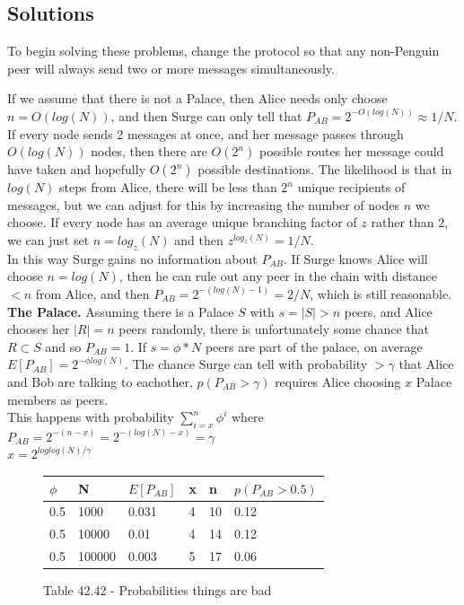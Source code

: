 \documentclass{paper}
\begin{document}
\subsection{Solutions}
To begin solving these problems, change the protocol so that any non-Penguin peer will always send two or more messages simultaneously.

If we assume that there is not a Palace, then Alice needs only choose $n = O(log(N))$, and then Surge can only tell that $P_{AB} = 2^{-O(log(N))} \approx 1/N $. If every node sends 2 messages at once, and her message passes through $O(log(N))$ nodes, then there are $O(2^n)$ possible routes her message could have taken and hopefully $O(2^n)$ possible destinations. The likelihood is that in $log(N)$ steps from Alice, there will be less than $2^n$ unique recipients of messages, but we can adjust for this by increasing the number of nodes $n$ we choose. If every node has an average unique branching factor of $z$ rather than $2$, we can just set $n = log_z(N)$ and then $z^{log_z(N)} = 1/N$.
\\In this way Surge gains no information about $P_{AB}$. If Surge knows Alice will choose $n = log(N)$, then he can rule out any peer in the chain with distance $< n$ from Alice, and then $P_{AB} = 2^{-(log(N)-1)} = 2/N$, which is still reasonable. 
\\
\textbf{The Palace.} Assuming there is a Palace $S$ with $s = |S| > n$ peers, and Alice chooses her $|R| = n$ peers randomly, there is unfortunately some chance that $R \subset S$ and so $P_{AB} = 1$. If $s = \phi*N$ peers are part of the palace, on average $E[P_{AB}] = 2^{-\phi log(N)}$. The chance Surge can tell with probability $> \gamma$ that Alice and Bob are talking to eachother, $p(P_{AB} > \gamma)$ requires Alice choosing $x$ Palace members as peers. 
\\This happens with probability $\sum\limits_{i=x}^n\phi^i$ where 
\\ $P_{AB} = 2^{-(n - x)} = 2^{-(log(N) - x)} = \gamma$
\\ $x = 2^{loglog(N)/\gamma}$

\begin{figure}[ht]
    \begin{tabular}{| l | l | l | l | l | l |}
      \hline
      $\phi$ & N & $E[P_{AB}]$ & x & n & $p(P_{AB} > 0.5)$ \\\hline
      0.5 & 1000 & 0.031 & 4 & 10 & 0.12\\
      0.5 & 10000 & 0.01 & 4 & 14 & 0.12\\
      0.5 & 100000 & 0.003 & 5 & 17 & 0.06\\
      \hline
    \end{tabular}
    \caption{Table 42.42 - Probabilities things are bad}
\end{figure}
\end{document}

